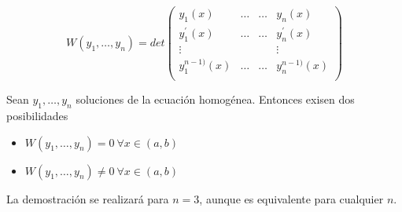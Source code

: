 $$W(y_1, \hdots, y_n) = det\begin{pmatrix}
y_1(x)& \hdots& \hdots& y_n(x)\\
y^\prime_1(x)& \hdots& \hdots& y^\prime_n(x)\\
\vdots& & & \vdots\\
y^{n-1)}_1(x)& \hdots& \hdots& y^{n-1)}_n(x)\\
\end{pmatrix}$$

\begin{theorem}
Sean $y_1, \hdots, y_n$ soluciones de la ecuación homogénea. Entonces exisen dos posibilidades
\begin{itemize}
\item $W(y_1, \hdots, y_n) = 0 \ \forall x\in (a,b)$
\item $W(y_1, \hdots, y_n) \neq 0 \ \forall x\in (a,b)$
\end{itemize}
\end{theorem}
La demostración se realizará para $n=3$, aunque es equivalente para cualquier $n$.
